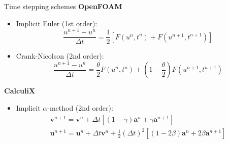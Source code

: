 \documentclass[
  english,            %
  aspectratio=43,    %
]{tumbeamer}
\begin{document}
\begin{frame}{Time stepping schemes}
\vspace{10pt}
\large
\textbf{OpenFOAM}
\normalsize
\vspace{10pt}
\begin{itemize}
    \item Implicit Euler (1st order):
    \begin{equation}
        \frac{u^{n+1} - u^n}{\Delta t} = \frac{1}{2} \left[F(u^n, t^n) +  F(u^{n+1}, t^{n+1}) \right]
    \end{equation}
    \item Crank-Nicolson (2nd order): 
    \begin{equation}
        \frac{u^{n+1} - u^n}{\Delta t} = \frac{\theta}{2} F(u^{n}, t^{n}) + \left( 1 - \frac{\theta}{2} \right) F(u^{n+1}, t^{n+1})
    \end{equation}

\end{itemize}

\pause
\large
\textbf{CalculiX}
\normalsize
\vspace{10pt}
\begin{itemize}
    \item Implicit $\alpha$-method (2nd order):
    \begin{gather}
        \boldsymbol{v}^{n+1} = \boldsymbol{v}^n + \Delta t \left[ (1 - \gamma) \boldsymbol{a}^n + \gamma \boldsymbol{a}^{n+1} \right] \\
        \boldsymbol{u}^{n+1} = \boldsymbol{u}^n + \Delta t \boldsymbol{v}^n + \frac{1}{2} (\Delta t)^2 \left[ (1 - 2\beta) \boldsymbol{a}^n + 2\beta \boldsymbol{a}^{n+1} \right]
    \end{gather} 
\end{itemize}    
\end{frame}
\end{document}

